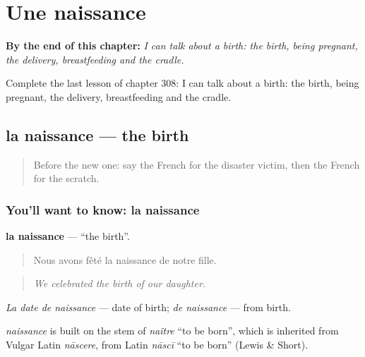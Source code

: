 
\chapter{Une naissance}
\label{ch:fr-une-naissance}

\begin{chapteropening}
\textbf{By the end of this chapter:} \emph{I can talk about a birth: the birth, being pregnant, the delivery, breastfeeding and the cradle.}

Complete the last lesson of chapter 308: I can talk about a birth: the birth, being pregnant, the delivery, breastfeeding and the cradle.
\end{chapteropening}

\section[la naissance]{la naissance — the birth}

\label{lesson:FR-C308-naissance}



\begin{quote}
Before the new one: say the French for the disaster victim, then the French for the scratch.
\end{quote}

\subsection*{You'll want to know: la naissance}
\textbf{la naissance} — \textquotedblleft{}the birth\textquotedblright{}.

\begin{quote}
Nous avons fêté la naissance de notre fille.
\end{quote}

\begin{quote}
\emph{We celebrated the birth of our daughter.}
\end{quote}

\emph{La date de naissance} — date of birth; \emph{de naissance} — from birth.

\begin{cousinweb}
\emph{naissance} is built on the stem of \emph{naître} \textquotedblleft{}to be born\textquotedblright{}, which is inherited from Vulgar Latin \emph{nāscere}, from Latin \emph{nāscī} \textquotedblleft{}to be born\textquotedblright{} (Lewis \& Short).
\end{cousinweb}

